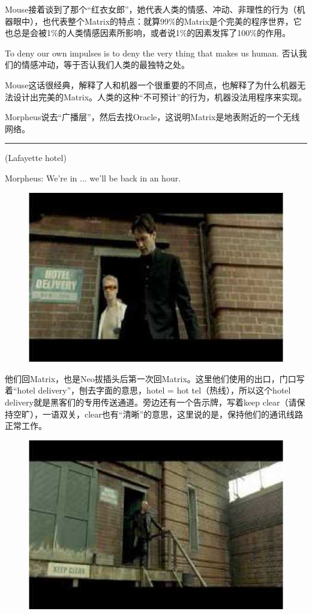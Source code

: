 \documentclass{ctexart}
\newcommand{\myparsep}{\noindent \rule[0.5ex]{\linewidth}{1pt}}
\newenvironment{myquote}{\color{green} \setlength{\leftskip}{6em} \setlength{\rightskip}{4em} \setlength{\parindent}{-2em}}{\par}
\begin{document}
Mouse接着谈到了那个“红衣女郎”，她代表人类的情感、冲动、非理性的行为（机器眼中），也代表整个Matrix的特点：就算99\%的Matrix是个完美的程序世界，它也总是会被1\%的人类情感因素所影响，或者说1\%的因素发挥了100\%的作用。

To deny our own impulses is to deny the very thing that makes us human. 否认我们的情感冲动，等于否认我们人类的最独特之处。

Mouse这话很经典，解释了人和机器一个很重要的不同点，也解释了为什么机器无法设计出完美的Matrix。人类的这种“不可预计”的行为，机器没法用程序来实现。

Morpheus说去“广播层”，然后去找Oracle，这说明Matrix是地表附近的一个无线网络。

\myparsep

\begin{myquote}
(Lafayette hotel)

Morpheus: We're in ... we'll be back in an hour.
\end{myquote}

\begin{figure}[htb]
\centering
\includegraphics[width=0.5\linewidth]{fig/read_Matrix-40}
\end{figure}

他们回Matrix，也是Neo拔插头后第一次回Matrix。这里他们使用的出口，门口写着“hotel delivery”，刨去字面的意思，hotel = hot tel（热线），所以这个hotel delivery就是黑客们的专用传送通道。旁边还有一个告示牌，写着keep clear（请保持空旷），一语双关，clear也有“清晰”的意思，这里说的是，保持他们的通讯线路正常工作。

\begin{figure}[htb]
\centering
\includegraphics[width=0.5\linewidth]{fig/read_Matrix-41}
\end{figure}
\end{document}
